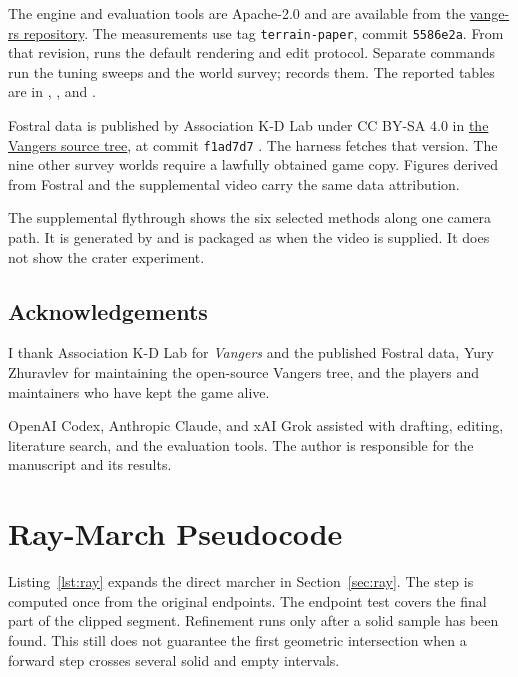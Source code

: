 \documentclass{jcgt}
\newcommand{\code}[1]{\texttt{#1}}
\begin{document}
The engine and evaluation tools are Apache-2.0 and are available from the \href{https://github.com/kvark/vange-rs}{vange-rs repository}. The measurements use tag \code{terrain-paper}, commit \code{5586e2a}. From that revision,  runs the default rendering and edit protocol. Separate commands run the tuning sweeps and the world survey;  records them. The reported tables are in , , and .

Fostral data is published by Association K-D Lab under CC BY-SA 4.0 in \href{https://github.com/KranX/Vangers/tree/f1ad7d7/data/thechain/fostral}{the Vangers source tree}, at commit \code{f1ad7d7} \citep{vangerssource}. The harness fetches that version. The nine other survey worlds require a lawfully obtained game copy. Figures derived from Fostral and the supplemental video carry the same data attribution.

The supplemental flythrough shows the six selected methods along one camera path. It is generated by  and is packaged as  when the video is supplied. It does not show the crater experiment.

\subsection*{Acknowledgements}

I thank Association K-D Lab for \emph{Vangers} and the published Fostral data, Yury Zhuravlev for maintaining the open-source Vangers tree, and the players and maintainers who have kept the game alive.

OpenAI Codex, Anthropic Claude, and xAI Grok assisted with drafting, editing, literature search, and the evaluation tools. The author is responsible for the manuscript and its results.

\FloatBarrier
\clearpage
\appendix
\section{Ray-March Pseudocode}\label{sec:ray-code}

Listing~\ref{lst:ray} expands the direct marcher in Section~\ref{sec:ray}. The step is computed once from the original endpoints. The endpoint test covers the final part of the clipped segment. Refinement runs only after a solid sample has been found. This still does not guarantee the first geometric intersection when a forward step crosses several solid and empty intervals.
\end{document}
